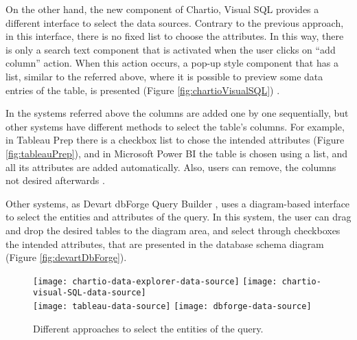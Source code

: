 On the other hand, the new component of Chartio, Visual SQL provides a different interface to select the data sources. Contrary to the previous approach, in this interface, there is no fixed list to choose the attributes. In this way, there is only a search text component that is activated when the user clicks on “add column” action. When this action occurs, a pop-up style component that has a list, similar to the referred above, where it is possible to preview some data entries of the table, is presented (Figure \ref{fig:chartioVisualSQL}) \cite{chartioVisualSQL}. 

In the systems referred above the columns are added one by one sequentially, but other systems have different methods to select the table’s columns. For example, in Tableau Prep \cite{tableauPrep} there is a checkbox list to chose the intended attributes (Figure \ref{fig:tableauPrep}), and in Microsoft Power BI \cite{powerBI} the table is chosen using a list, and all its attributes are added automatically. Also, users can remove, the columns not desired afterwards \cite{tableauPrepHelpWhatsNew,powerBIShapeAndCombineData}.

Other systems, as Devart dbForge Query Builder \cite{dbForgeQueryBuilder}, uses a diagram-based interface to select the entities and attributes of the query. In this system, the user can drag and drop the desired tables to the diagram area, and select through checkboxes the intended attributes, that are presented in the database schema diagram (Figure \ref{fig:devartDbForge}).


\begin{figure}[tb]
    \centering
      {\texttt{[image: chartio-data-explorer-data-source]}}%
      {\texttt{[image: chartio-visual-SQL-data-source]}}%
      \\
    {\texttt{[image: tableau-data-source]}}%
    {\texttt{[image: dbforge-data-source]}}%
  \caption{Different approaches to select the entities of the query.}
    \label{fig:approaches_select_data_sources}
  \end{figure}

